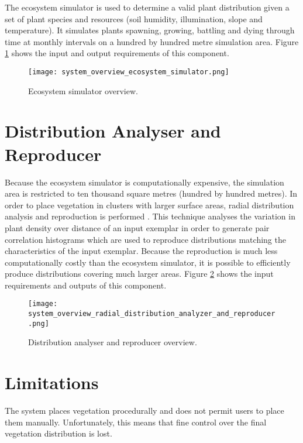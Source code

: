 The ecosystem simulator is used to determine a valid plant distribution given a set of plant species and resources (soil humidity, illumination, slope and temperature). It simulates plants spawning, growing, battling and dying through time at monthly intervals on a hundred by hundred metre simulation area. Figure \ref{fig:system_overview_ecosystem_simulator} shows the input and output requirements of this component.

\begin{figure}
\center
	\texttt{[image: system\_overview\_ecosystem\_simulator.png]}
	\caption{ Ecosystem simulator overview.}	
	\label{fig:system_overview_ecosystem_simulator}
\end{figure}

\section{Distribution Analyser and Reproducer}

Because the ecosystem simulator is computationally expensive, the simulation area is restricted to ten thousand square metres (hundred by hundred metres). In order to place vegetation in clusters with larger surface areas, radial distribution analysis and reproduction is performed \cite{Emilien,Boudon2007,Lane2002}. This technique analyses the variation in plant density over distance of an input exemplar in order to generate pair correlation histograms which are used to reproduce distributions matching the characteristics of the input exemplar. Because the reproduction is much less computationally costly than the ecosystem simulator, it is possible to efficiently produce distributions covering much larger areas. Figure \ref{fig:system_overview_distribution_analyser_and_reproducer} shows the input requirements and outputs of this component.

\begin{figure}
\center
	\texttt{[image: system\_overview\_radial\_distribution\_analyzer\_and\_reproducer.png]}
	\caption{ Distribution analyser and reproducer overview.}	
	\label{fig:system_overview_distribution_analyser_and_reproducer}
\end{figure}

\section{Limitations}

The system places vegetation procedurally and does not permit users to place them manually. Unfortunately, this means that fine control over the final vegetation distribution is lost.\\

